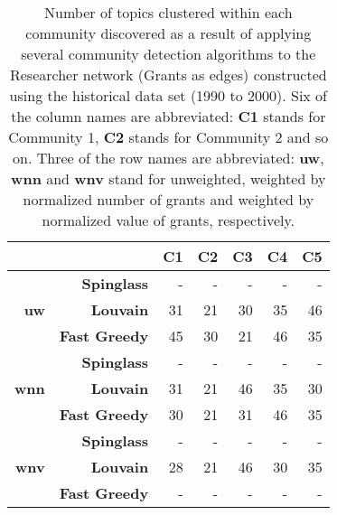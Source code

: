 \begin{table}[!htbp]
\centering
\caption[Number of topics clustered within each community discovered in the Researcher network (Grants as edges) constructed using the historical data set (1990 to 2000)]{Number of topics clustered within each community discovered as a result of applying several community detection algorithms to the Researcher network (Grants as edges) constructed using the historical data set (1990 to 2000). Six of the column names are abbreviated: \textbf{C1} stands for Community 1, \textbf{C2} stands for Community 2 and so on. Three of the row names are abbreviated: \textbf{uw}, \textbf{wnn} and \textbf{wnv} stand for unweighted, weighted by normalized number of grants and weighted by normalized value of grants, respectively.}
\label{table:researcher_b_past1_numbers_appendix}
\begin{tabular}{r|r|r|r|r|r|r}
\textbf{} & \textbf{} & \textbf{C1} & \textbf{C2} & \textbf{C3} & \textbf{C4} & \textbf{C5}\\
\hline
\multirow{3}{*}{\textbf{uw}}
& \textbf{Spinglass} & {-} & {-} & {-} & {-} & {-}\\
& \textbf{Louvain} & {31} & {21} & {30} & {35} & {46}\\
& \textbf{Fast Greedy} & {45} & {30} & {21} & {46} & {35}\\
\hline
\multirow{3}{*}{\textbf{wnn}}
& \textbf{Spinglass} & {-} & {-} & {-} & {-} & {-}\\
& \textbf{Louvain} & {31} & {21} & {46} & {35} & {30}\\
& \textbf{Fast Greedy} & {30} & {21} & {31} & {46} & {35}\\
\hline
\multirow{3}{*}{\textbf{wnv}}
& \textbf{Spinglass} & {-} & {-} & {-} & {-} & {-}\\
& \textbf{Louvain} & {28} & {21} & {46} & {30} & {35}\\
& \textbf{Fast Greedy} & {-} & {-} & {-} & {-} & {-}
\end{tabular}
\end{table}

